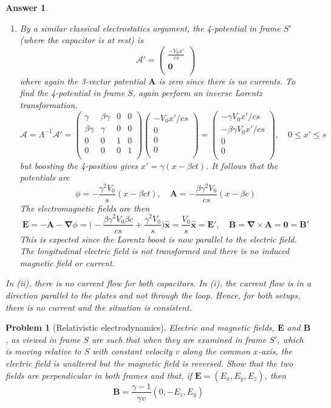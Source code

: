 \documentclass[a4paper]{article}
\newtheorem{ans}{Answer}
\theoremstyle{new}
\newtheorem{qns}{Problem}
\begin{document}
\begin{ans}
\begin{enumerate}[label=(\roman*)]
\item By a similar classical electrostatics argument, the 4-potential in frame $S'$ (where the capacitor is at rest) is
$$\mathcal{A}'=\begin{pmatrix}\frac{-V_0x'}{cs}\\\boldsymbol{0}\\\end{pmatrix}$$
where again the 3-vector potential $\mathbf{A}$ is zero since there is no currents. To find the 4-potential in frame $S$, again perform an inverse Lorentz transformation.
$$\mathcal{A}=\Lambda^{-1}\mathcal{A}'=\begin{pmatrix}\gamma&\beta\gamma&0&0\\\beta\gamma&\gamma&0&0\\0&0&1&0\\0&0&0&1\\\end{pmatrix}\begin{pmatrix}-V_0x'/cs\\0\\0\\0\\\end{pmatrix}=\begin{pmatrix}-\gamma V_0x'/cs\\-\beta\gamma V_0x'/cs\\0\\0\\\end{pmatrix},\quad 0\leq x'\leq s$$
but boosting the 4-position gives $x'=\gamma(x-\beta ct)$. It follows that the potentials are
$$\phi=-\frac{\gamma^2V_0}{s}(x-\beta ct),\quad\mathbf{A}=-\frac{\beta\gamma^2V_0}{cs}(x-\beta c)$$
The electromagnetic fields are then
$$\mathbf{E}=-\mathbf{\dot{A}}-\boldsymbol{\nabla}\phi=\bigg(-\frac{\beta\gamma^2V_0\beta c}{cs}+\frac{\gamma^2V_0}{s}\bigg)\mathbf{\hat{x}}=\frac{V_0}{s}\mathbf{\hat{x}}=\mathbf{E'},\quad\mathbf{B}=\boldsymbol{\nabla}\times\mathbf{A}=\boldsymbol{0}=\mathbf{B'}$$
This is expected since the Lorentz boost is now parallel to the electric field. The longitudinal electric field is not transformed and there is no induced magnetic field or current.
\end{enumerate}
In (ii), there is no current flow for both capacitors. In (i), the current flow is in a direction parallel to the plates and not through the loop. Hence, for both setups, there is no current and the situation is consistent.
\end{ans}
\begin{qns}[Relativistic electrodynamics]
Electric and magnetic fields, $\mathbf{E}$ and $\mathbf{B}$, as viewed in frame $S$ are such that when they are examined in frame $S'$, which is moving relative to $S$ with constant velocity $v$ along the common $x$-axis, the electric field is unaltered but the magnetic field is reversed. Show that the two fields are perpendicular in both frames and that, if $\mathbf{E} = (E_x, E_y, E_z)$, then
$$\mathbf{B}=\frac{\gamma-1}{\gamma v}(0,-E_z,E_y)$$
\end{qns}
\end{document}
